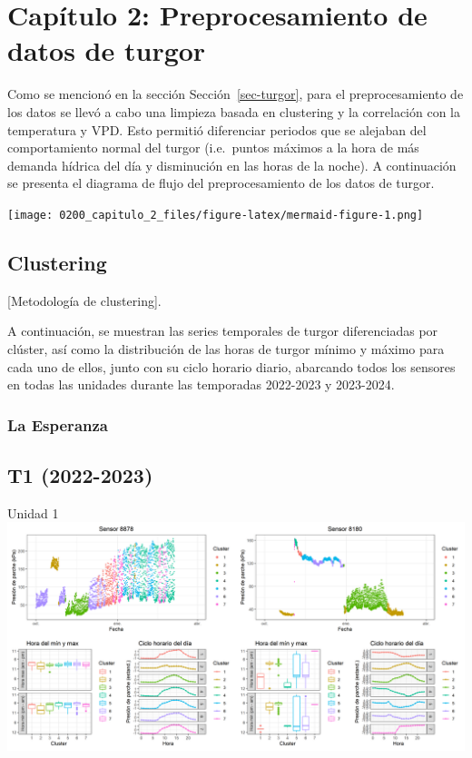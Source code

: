 \documentclass[
  letterpaper,
  DIV=11,
  numbers=noendperiod]{scrreprt}
\begin{document}
\part{Capítulo 2: Preprocesamiento de datos de turgor}

Como se mencionó en la sección Sección~\ref{sec-turgor}, para el
preprocesamiento de los datos se llevó a cabo una limpieza basada en
clustering y la correlación con la temperatura y VPD. Esto permitió
diferenciar periodos que se alejaban del comportamiento normal del
turgor (i.e.~puntos máximos a la hora de más demanda hídrica del día y
disminución en las horas de la noche). A continuación se presenta el
diagrama de flujo del preprocesamiento de los datos de turgor.

\texttt{[image: 0200\_capitulo\_2\_files/figure-latex/mermaid-figure-1.png]}

\chapter{Clustering}\label{clustering}

{[}Metodología de clustering{]}.

A continuación, se muestran las series temporales de turgor
diferenciadas por clúster, así como la distribución de las horas de
turgor mínimo y máximo para cada uno de ellos, junto con su ciclo
horario diario, abarcando todos los sensores en todas las unidades
durante las temporadas 2022-2023 y 2023-2024.

\section{La Esperanza}\label{la-esperanza-1}

\chapter{T1 (2022-2023)}

Unidad 1
\includegraphics{figuras/01_turgor_sensor/2022_2023_La_Esperanza_T1_Unidad_1.png}
\end{document}

